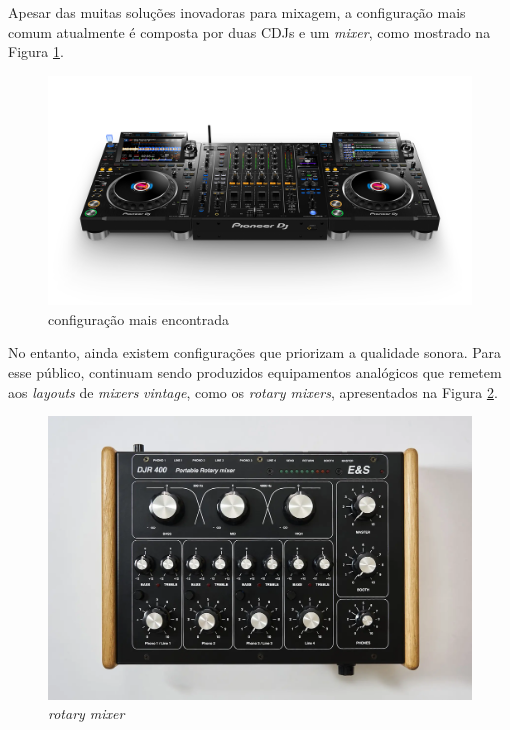 Apesar das muitas soluções inovadoras para mixagem, a configuração mais comum atualmente é composta por duas CDJs e um \textit{mixer}, como mostrado na Figura \ref{fig17}.

\begin{figure}[h]
	\centering
    \includegraphics[scale=0.3]{figuras/fig17.png}
	\caption{configuração mais encontrada \cite{pioneerdjDJMA94channel}}
	\label{fig17}
\end{figure}

No entanto, ainda existem configurações que priorizam a qualidade sonora. Para esse público, continuam sendo produzidos equipamentos analógicos que remetem aos \textit{layouts} de \textit{mixers} \textit{vintage}, como os \textit{rotary mixers}, apresentados na Figura \ref{fig18}.

\begin{figure}[h]
	\centering
    \includegraphics[scale=0.2]{figuras/fig18.png}
	\caption{\textit{rotary mixer} \cite{electroniquespectacleampAUDIO}}
	\label{fig18}
\end{figure}

